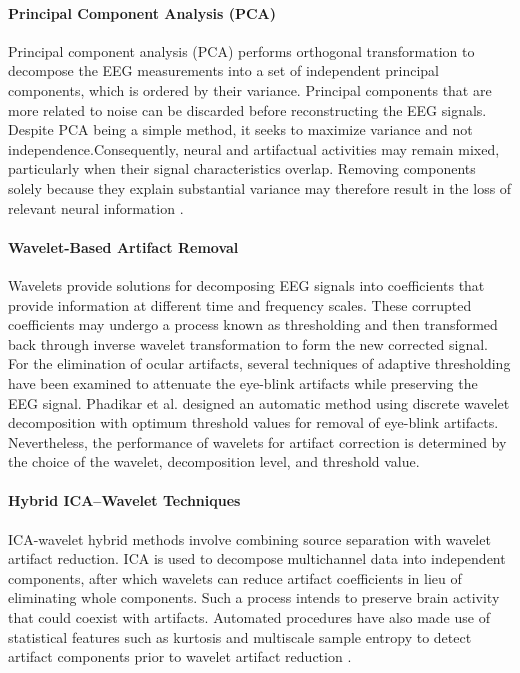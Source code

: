\documentclass[ASNA,twocolumn]{USG}
\begin{document}
\paragraph{Principal Component Analysis (PCA)}
Principal component analysis (PCA) performs orthogonal transformation to decompose the EEG measurements into a set of independent principal components, which is ordered by their variance. Principal components that are more related to noise can be discarded before reconstructing the EEG signals. Despite PCA being a simple method, it seeks to maximize variance and not independence.Consequently, neural and artifactual activities may remain mixed, particularly when their signal characteristics overlap. Removing components solely because they explain substantial variance may therefore result in the loss of relevant neural information \cite{jiang2019removal}.

\paragraph{Wavelet-Based Artifact Removal}
Wavelets provide solutions for decomposing EEG signals into coefficients that provide information at different time and frequency scales. These corrupted coefficients may undergo a process known as thresholding and then transformed back through inverse wavelet transformation to form the new corrected signal. For the elimination of ocular artifacts, several techniques of adaptive thresholding have been examined to attenuate the eye-blink artifacts while preserving the EEG signal. Phadikar et al. \cite{phadikar2020automatic} designed an automatic method using discrete wavelet decomposition with optimum threshold values for removal of eye-blink artifacts. Nevertheless, the performance of wavelets for artifact correction is determined by the choice of the wavelet, decomposition level, and threshold value.

\paragraph{Hybrid ICA--Wavelet Techniques}
ICA-wavelet hybrid methods involve combining source separation with wavelet artifact reduction. ICA is used to decompose multichannel data into independent components, after which wavelets can reduce artifact coefficients in lieu of eliminating whole components. Such a process intends to preserve brain activity that could coexist with artifacts. Automated procedures have also made use of statistical features such as kurtosis and multiscale sample entropy to detect artifact components prior to wavelet artifact reduction \cite{val2019optimization}.
\end{document}
